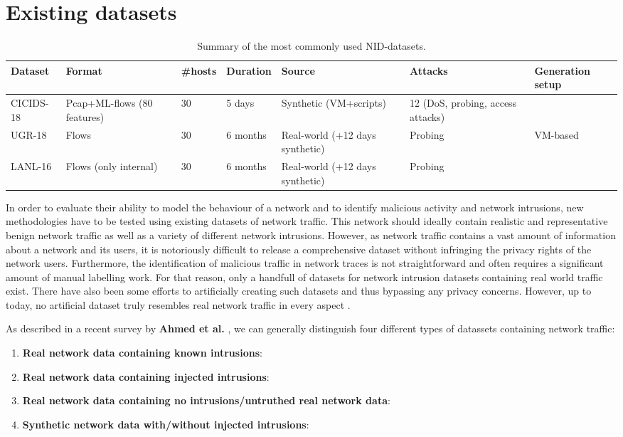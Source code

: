 \section{Existing datasets}


\begin{table}
\centering
\begin{tabular}{p{2.5cm}|p{3cm}|p{2.3cm}|p{2cm}|p{3.5cm}|p{3.5cm} |p{3.5cm}}
Dataset&Format&\#hosts & Duration & Source & Attacks & Generation setup\\ \hline \hline
CICIDS-18& Pcap+ML-flows (80 features) & 30 & 5 days &Synthetic (VM+scripts)& 12 (DoS, probing, access attacks) \\ \hline
UGR-18& Flows & 30 & 6 months &Real-world (+12 days synthetic) & Probing & VM-based\\ \hline
LANL-16& Flows (only internal) & 30 & 6 months &Real-world (+12 days synthetic) & Probing\\ \hline
\end{tabular}
\caption{Summary of the most commonly used NID-datasets.}\label{Tab:NIDdatasets}
\end{table}


In order to evaluate their ability to model the behaviour of a network and to identify malicious activity and network intrusions, new methodologies have to be tested using existing datasets of network traffic. This network should ideally contain realistic and representative benign network traffic as well as a variety of different network intrusions. However, as  network traffic contains a vast amount of information about a network and its users, it is notoriously difficult to release a comprehensive dataset without infringing the privacy rights of the network users. Furthermore, the identification of malicious traffic in network traces is not straightforward and often requires a significant amount of manual labelling work.
For that reason, only a handfull of datasets for network intrusion datasets containing real world traffic exist. There have also been some efforts to artificially creating such datasets and thus bypassing any privacy concerns. However, up to today, no artificial dataset truly resembles real network traffic in every aspect \cite{nisioti2018intrusion}.

As described in a recent survey by \textbf{Ahmed et al.} \cite{ahmed2016survey}, we can generally distinguish four different types of datassets containing network traffic:

\begin{enumerate}

\item \textbf{Real network data containing known intrusions}: 

\item \textbf{Real network data containing injected intrusions}:

\item \textbf{Real network data containing no intrusions/untruthed real network data}:

\item \textbf{Synthetic network data with/without injected intrusions}:

\end{enumerate}


